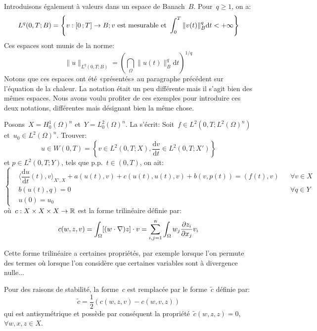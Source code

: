 \medskip
Introduisons également  à valeurs dans un espace
de Banach~$B$. Pour~$q\ge1$, on a:
\begin{equation}
L^q(0,T;B) =\left\{ v: \mathopen{[}0\,;T\mathclose{]}\rightarrow B; v \text{ est mesurable et }
\displaystyle\int_0^T \|v(t)\|^q_B \mathrm dt<+\infty\right\}
\end{equation}
Ces espaces sont munis de la norme:
\begin{equation}
\|u\|_{L^q(0,T;B)} = \left(\dint_\Omega\|u(t)\|^q_B \mathrm dt\right)^{1/q}
\end{equation}
Notons que ces espaces ont été «présentés» au paragraphe précédent sur l'équation de la chaleur. La notation était un peu différente mais il s'agit bien des mêmes espaces. Nous avons voulu profiter de ces exemples pour introduire ces deux notations, différentes mais désignant bien la même chose.

\medskip
Posons~$X=H^1_0(\Omega)^n$ et~$Y=L^2_0(\Omega)^n$.
\medskip
La  s'écrit: Soit~$f\in L^2(0,T;L^2(\Omega)^n)$ et~$u_0\in L^2(\Omega)^n$.
Trouver:
\begin{equation}u\in W(0,T)=\left\{v\in L^2(0,T;X), \dfrac{\mathrm dv}{\mathrm dt}\in L^2(0,T;X') \right\}\end{equation} et
$p\in L^2(0,T;Y)$, tels que p.p.~$t\in(0,T)$, on ait:
\begin{equation}\left\{
\begin{aligned}
&\langle\dfrac{\mathrm du}{\mathrm dt}(t),v\rangle_{X',X}+a(u(t),v)+c(u(t),u(t),v)+b(v,p(t)) = (f(t),v) &&
\forall v\in X\\
&b(u(t),q) =0 &&\forall q \in Y\\
&u(0)=u_0
\end{aligned}\right.
\end{equation}
où~$c: X\times X\times X\rightarrow\mathbb R$ est la forme trilinéaire définie par:
\begin{equation}
c(w,z,v) = \dint_\Omega [(w\cdot\nabla)z]\cdot v %
=\dsum_{i,j=1}^n \dint_\Omega w_j\dfrac{\partial z_i}{\partial x_j} v_i %
\end{equation}

\medskip
Cette forme trilinéaire a certaines propriétés, par exemple lorsque l'on permute des termes où lorsque l'on considère que certaines variables sont à divergence nulle...

\medskip
Pour des raisons de stabilité, la forme~$c$ est remplacée par le forme~$\tilde{c}$ définie par:
\begin{equation}
\tilde{c} = \dfrac12 \left(c(w,z,v)-c(w,v,z)\right)
\end{equation}
qui est antisymétrique et possède par conséquent la propriété~$\tilde{c}(w,z,z)=0$,
$\forall w,x,z \in X$.

